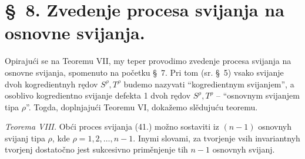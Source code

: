 \documentclass[11pt]{article}
\begin{document}
\section*{\S\ 8. Zvedenje procesa svijanja na osnovne svijanja.}

Opirajući se na Teoremu VII, my teper provodimo zvedenje procesa svijanja na osnovne svijanja, spomenuto na početku \S\ 7. Pri tom (sr. \S\ 5) vsako svijanje dvoh kogredientnyh rędov $S^\rho,T^\rho$ budemo nazyvati ``kogredientnym svijanjem'', a osoblivo kogredientno svijanje defekta 1 dvoh rędov $S^\rho,T^\rho$ -- ``osnovnym svijanjem tipa $\rho$''. Togda, doplnjajući Teoremu VI, dokažemo slědujuću teoremu.

\emph{Teorema VIII.} Obći proces svijanja (41.) možno sostaviti iz $(n-1)$ osnovnyh svijanj tipa $\rho$, kde $\rho=1,2,\ldots,n-1$. Inymi slovami, za tvorjenje vsih invariantnyh tvorjenj dostatočno jest sukcesivno priměnjenje tih $n-1$ osnovnyh svijanj.
\end{document}
